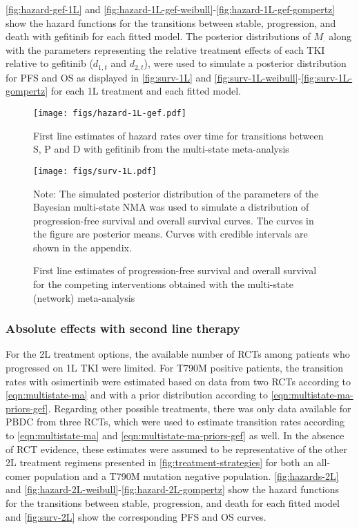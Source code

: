 \documentclass[11pt,final,fleqn]{article}\usepackage[]{graphicx}\usepackage[]{color}
\theoremstyle{plain}
\begin{document}
{\autoref{fig:hazard-gef-1L} and \autoref{fig:hazard-1L-gef-weibull}-\autoref{fig:hazard-1L-gef-gompertz} show the hazard functions for the transitions between stable, progression, and death with gefitinib for each fitted model. The posterior distributions of $M_{\cdot}$ along with the parameters representing the relative treatment effects of each TKI relative to gefitinib ($d_{1, t}$ and ${d_{2,t}}$), were used to simulate a posterior distribution for PFS and OS as displayed in \autoref{fig:surv-1L} and \autoref{fig:surv-1L-weibull}-\autoref{fig:surv-1L-gompertz} for each 1L treatment and each fitted model. 


\begin{figure}[h]
\centering
\texttt{[image: figs/hazard-1L-gef.pdf]} 
\caption{First line estimates of hazard rates over time for transitions between S, P and D with gefitinib from the multi-state meta-analysis}\label{fig:hazard-gef-1L}
\end{figure}


\begin{figure}[h]
\centering
\texttt{[image: figs/surv-1L.pdf]} 
\caption{First line estimates of progression-free survival and overall survival for the competing interventions obtained with the multi-state (network) meta-analysis}\label{fig:surv-1L}
\begin{minipage}{\linewidth}
\footnotesize
Note: The simulated posterior distribution of the parameters of the Bayesian multi-state NMA was used to simulate a distribution of progression-free survival and overall survival curves. The curves in the figure are posterior means. Curves with credible intervals are shown in the appendix.
\end{minipage}
\end{figure}

\FloatBarrier


\subsubsection{Absolute effects with second line therapy}
For the 2L treatment options, the available number of RCTs among patients who progressed on 1L TKI were limited. For T790M positive patients, the transition rates with osimertinib were estimated based on data from two RCTs according to \autoref{eqn:multistate-ma} and with a prior distribution according to \autoref{eqn:multistate-ma-priors-gef}. Regarding other possible treatments, there was only data available for PBDC from three RCTs, which were used to estimate transition rates according to \autoref{eqn:multistate-ma} and \autoref{eqn:multistate-ma-priors-gef} as well. In the absence of RCT evidence, these estimates were assumed to be representative of the other 2L treatment regimens presented in \autoref{fig:treatment-strategies} for both an all-comer population and a T790M mutation negative population. \autoref{fig:hazards-2L} and \autoref{fig:hazard-2L-weibull}-\autoref{fig:hazard-2L-gompertz} show the hazard functions for the transitions between stable, progression, and death for each fitted model and \autoref{fig:surv-2L} show the corresponding PFS and OS curves.




}
\end{document}
